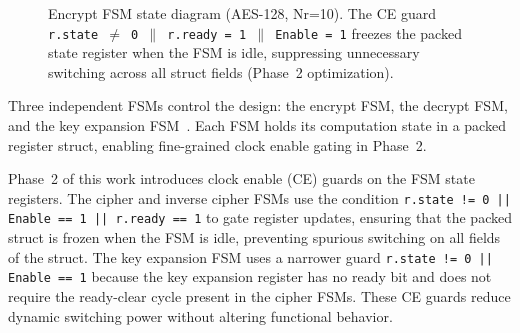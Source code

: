 \begin{figure}[!htbp]
\centering
{}
\caption{Encrypt FSM state diagram (AES-128, Nr=10). The CE guard
\texttt{r.state\,$\neq$\,0\,$\|$\,r.ready\,=\,1\,$\|$\,Enable\,=\,1}
freezes the packed state register when the FSM is idle, suppressing unnecessary
switching across all struct fields (Phase~2 optimization).}
\label{fig:encrypt_fsm}
\end{figure}

Three independent FSMs control the design: the encrypt FSM, the decrypt FSM, and the key
expansion FSM~\cite{mcloone_fsm_aes_2003}. Each FSM holds its computation state in a packed
register struct, enabling fine-grained clock enable gating in Phase~2.

Phase~2 of this work introduces clock enable (CE) guards on the FSM state registers. The
cipher and inverse cipher FSMs use the condition
\texttt{r.state != 0 || Enable == 1 || r.ready == 1} to gate register updates, ensuring
that the packed struct is frozen when the FSM is idle, preventing spurious switching on all
fields of the struct. The key expansion FSM uses a narrower guard
\texttt{r.state != 0 || Enable == 1} because the key expansion register has no ready bit
and does not require the ready-clear cycle present in the cipher FSMs. These CE guards
reduce dynamic switching power without altering functional behavior.


